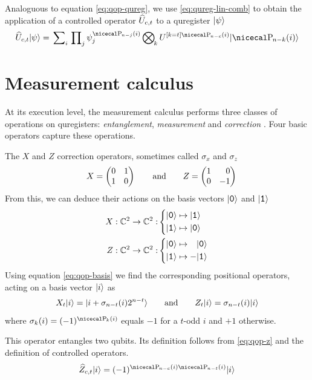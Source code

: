 \documentclass[a4paper,11pt, oneside]{report}
\newcommand{\concept}[1]{\emph{#1}}
\newcommand{\strongpar}{\medskip\par}
\begin{document}
\strongpar
Analoguous to equation \eqref{eq:qop-qureg}, we use \eqref{eq:qureg-lin-comb} to obtain the application of a controlled operator $\widehat{U}_{c,t}$ to a quregister $\lvert\psi\rangle$
\begin{equation}\label{eq:cop-qureg}
\cU_{c,t}\ket\psi = \Sum{i}\Product{j}\psi^{\parity_{n-j}(i)}_j \Tensor{k} U^{\ive{k=t}\parity_{n-c}(i)} \ket {\parity_{n-k}(i)}
\end{equation}


\section{Measurement calculus}
At its execution level, the measurement calculus performs three classes of operations on quregisters: \concept{entanglement}, \concept{measurement} and \concept{correction} \cite{vandriessche}. Four basic operators capture these operations.

 The $X$ and $Z$ correction operators, sometimes called $\sigma_x$ and $\sigma_z$ \cite{kaye-laflamme-mosca}
\begin{equation}
\quad X = \X \qquad\text{and}\qquad Z=\Z
\end{equation}
From this, we can deduce their actions on the basis vectors $\ketb 0$ and $\ketb 1$
\begin{align}
X: \complex^2 \to \complex^2 :& \left\{\begin{aligned}
     	      \ketb 0 & \mapsto \ketb 1\\
	      \ketb 1 & \mapsto \ketb 0
\end{aligned} \right. \label{qop-x}
\\
Z : \complex^2 \to \complex^2 :& \left\{\begin{aligned}
     	      \ketb 0 &\mapsto\phantom{-}\ketb 0\\
	      \ketb 1 &\mapsto -\ketb 1
\end{aligned} \right. \label{eq:qop-z}
\end{align}
Using equation \eqref{eq:qop-basis} we find the corresponding positional operators, acting on a basis vector $\lvert i\rangle$ as
\begin{equation}\label{qop-cz-basis}
X_t \lvert i\rangle = \lvert i + \sigma_{n-t}(i)2^{n-t}\rangle
\qquad\text{and}\qquad
Z_t \lvert i\rangle = \sigma_{n-t}(i)\lvert i\rangle
\end{equation}
where $\sigma_k(i) = (-1)^{\parity_k(i)}$ equals $-1$ for a $t$-odd $i$ and $+1$ otherwise.

 This operator entangles two qubits. Its definition follows from \eqref{eq:qop-z} and the definition of controlled operators.
\begin{equation}
\widehat{Z}_{c,t}\ket i = (-1)^{\parity_{n-c}(i) \parity_{n-t}(i)}\ket i
\end{equation}
\end{document}
